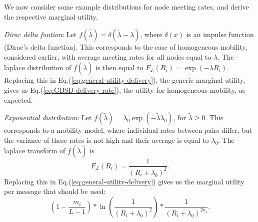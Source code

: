 We now consider some example distributions for node meeting rates, and derive the respective marginal utility.

\emph{Dirac delta funtion}: Let $f(\tilde{\lambda}) = \delta(\tilde{\lambda} - \lambda)$, where $\delta(x)$ is an impulse function (Dirac's delta function). This corresponds to the case of homogeneous mobility, considered earlier, with average meeting rates for all nodes equal to $\lambda$. The laplace distribution of $f(\tilde{\lambda})$ is then equal to $F_{\mathcal{L}}(R_{i}) = \exp(-\lambda R_{i})$. Replacing this in Eq.(\ref{eq:general-utility-delivery}), the generic marginal utility, gives us Eq.(\ref{eq:GBSD-delivery-rate}), the utility for homogeneous mobility, as expected.

\emph{Exponential distribution}: Let $f(\tilde{\lambda}) = \lambda_{0} \exp(-\tilde{\lambda} \lambda_{0})$, for $\tilde{\lambda} \ge 0$. This corresponds to a mobility model, where individual rates between pairs differ, but the variance of these rates is not high and their average is equal to $\lambda_0$. The laplace transform of $f(\tilde{\lambda})$ is
\begin{equation*}
F_{\mathcal{L}}(R_{i}) = \frac{1}{(R_{i} + \lambda_{0})^{2}}.
\end{equation*}
Replacing this in Eq.(\ref{eq:general-utility-delivery}) gives us the marginal utility per message that should be used:
\begin{equation}
(1 - \frac{m_i}{L-1}) * \ln(\frac{1}{(R_{i} + \lambda_{0})^{2}}) * \frac{1}{(R_{i} + \lambda_{0})^{2n_{i}}}.
\end{equation}

